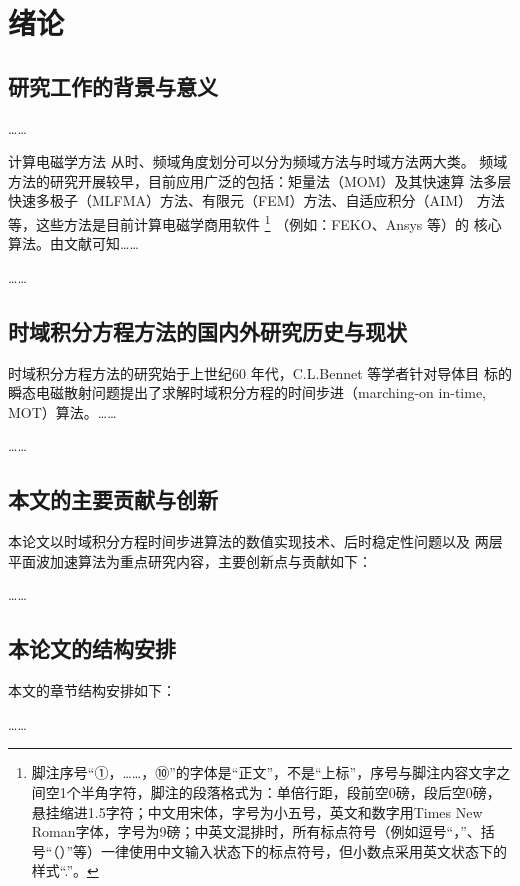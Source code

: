 
\chapter{绪论}
\section{研究工作的背景与意义}
……

计算电磁学方法
从时、频域角度划分可以分为频域方法与时域方法两大类。
频域方法的研究开展较早，目前应用广泛的包括：矩量法（MOM）及其快速算
法多层快速多极子（MLFMA）方法、有限元（FEM）方法、自适应积分（AIM）
方法等，这些方法是目前计算电磁学商用软件
\footnote{脚注序号“①，……，⑩”的字体是“正文”，不是“上标”，序号与脚注内容文字之间空1个半角字符，脚注的段落格式为：单倍行距，段前空0磅，段后空0磅，悬挂缩进1.5字符；中文用宋体，字号为小五号，英文和数字用Times New Roman字体，字号为9磅；中英文混排时，所有标点符号（例如逗号“，”、括号“（）”等）一律使用中文输入状态下的标点符号，但小数点采用英文状态下的样式“.”。}
（例如：FEKO、Ansys 等）的
核心算法。由文献\cite{feng997he,clerc2010discrete,xiao2012yi}可知……

……
\section{时域积分方程方法的国内外研究历史与现状}
时域积分方程方法的研究始于上世纪60 年代，C.L.Bennet 等学者针对导体目
标的瞬态电磁散射问题提出了求解时域积分方程的时间步进（marching-on in-time,
MOT）算法。……

……
\section{本文的主要贡献与创新}
本论文以时域积分方程时间步进算法的数值实现技术、后时稳定性问题以及
两层平面波加速算法为重点研究内容，主要创新点与贡献如下：

……
\section{本论文的结构安排}
本文的章节结构安排如下：

……
